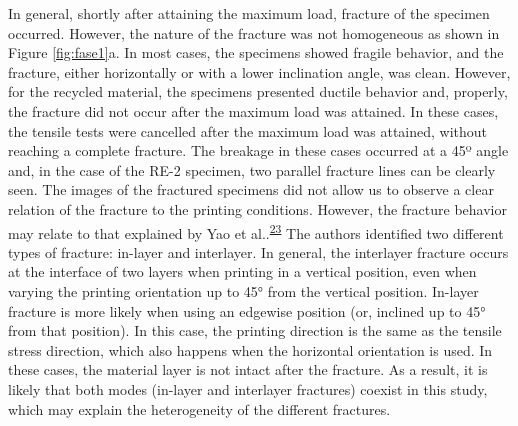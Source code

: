 \documentclass[
  12pt]{article}
\begin{document}
In general, shortly after attaining the maximum load, fracture of the specimen occurred. However, the nature of the fracture was not homogeneous as shown in Figure \ref{fig:fase1}a.
In most cases, the specimens showed fragile behavior, and the fracture, either horizontally or with a lower inclination angle, was clean.
However, for the recycled material, the specimens presented ductile behavior and, properly, the fracture did not occur after the maximum load was attained.
In these cases, the tensile tests were cancelled after the maximum load was attained, without reaching a complete fracture.
The breakage in these cases occurred at a 45º angle and, in the case of the RE-2 specimen, two parallel fracture lines can be clearly seen.
The images of the fractured specimens did not allow us to observe a clear relation of the fracture to the printing conditions.
However, the fracture behavior may relate to that explained by Yao et al..\textsuperscript{\protect\hyperlink{ref-Yao2019}{23}}
The authors identified two different types of fracture: in-layer and interlayer.
In general, the interlayer fracture occurs at the interface of two layers when printing in a vertical position, even when varying the printing orientation up to 45° from the vertical position.
In-layer fracture is more likely when using an edgewise position (or, inclined up to 45° from that position).
In this case, the printing direction is the same as the tensile stress direction, which also happens when the horizontal orientation is used.
In these cases, the material layer is not intact after the fracture.
As a result, it is likely that both modes (in-layer and interlayer fractures) coexist in this study, which may explain the heterogeneity of the different fractures.
\end{document}
